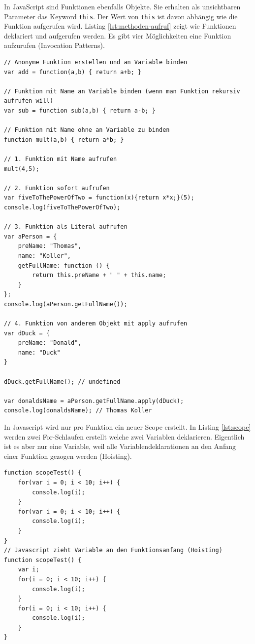 In JavaScript sind Funktionen ebenfalls Objekte. Sie erhalten als unsichtbaren Parameter das Keyword \lstinline|this|. Der Wert von \lstinline|this| ist davon abhängig wie die Funktion aufgerufen wird. Listing \ref{lst:methoden-aufruf} zeigt wie Funktionen deklariert und aufgerufen werden. Es gibt vier Möglichkeiten eine Funktion aufzurufen (Invocation Patterns).

\begin{lstlisting}[label=lst:methoden-aufruf,caption=Methoden aufrufen]
// Anonyme Funktion erstellen und an Variable binden
var add = function(a,b) { return a+b; }

// Funktion mit Name an Variable binden (wenn man Funktion rekursiv aufrufen will)
var sub = function sub(a,b) { return a-b; }

// Funktion mit Name ohne an Variable zu binden
function mult(a,b) { return a*b; }

// 1. Funktion mit Name aufrufen
mult(4,5);

// 2. Funktion sofort aufrufen
var fiveToThePowerOfTwo = function(x){return x*x;}(5);
console.log(fiveToThePowerOfTwo);

// 3. Funktion als Literal aufrufen
var aPerson = {
	preName: "Thomas",
	name: "Koller",
	getFullName: function () {
		return this.preName + " " + this.name;
	}
};
console.log(aPerson.getFullName());

// 4. Funktion von anderem Objekt mit apply aufrufen
var dDuck = {
	preName: "Donald",
	name: "Duck"
}

dDuck.getFullName(); // undefined

var donaldsName = aPerson.getFullName.apply(dDuck);
console.log(donaldsName); // Thomas Koller
\end{lstlisting}

In Javascript wird nur pro Funktion ein neuer Scope erstellt. In Listing \ref{lst:scope} werden zwei For-Schlaufen erstellt welche zwei Variablen deklarieren. Eigentlich ist es aber nur eine Variable, weil alle Variablendeklarationen an den Anfang einer Funktion gezogen werden (Hoisting). 

\begin{lstlisting}[label=lst:scope,caption=Scope]
function scopeTest() {
	for(var i = 0; i < 10; i++) {
		console.log(i);
	}
	for(var i = 0; i < 10; i++) {
		console.log(i);
	}
}
// Javascript zieht Variable an den Funktionsanfang (Hoisting)
function scopeTest() {
	var i;
	for(i = 0; i < 10; i++) {
		console.log(i);
	}
	for(i = 0; i < 10; i++) {
		console.log(i);
	}
}
\end{lstlisting}

